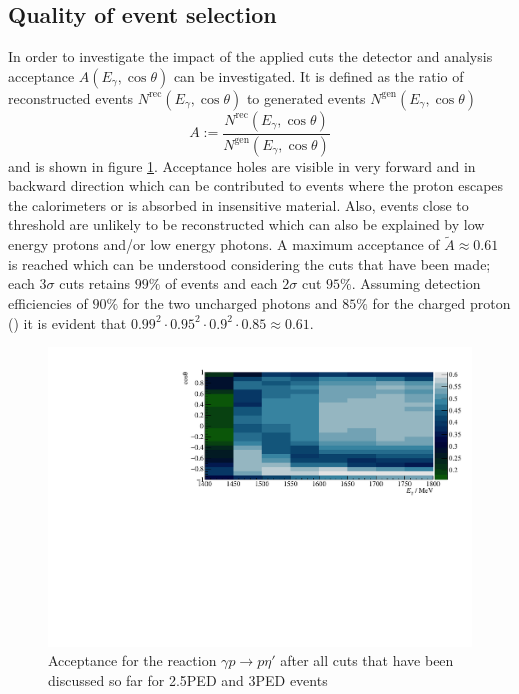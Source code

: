 \subsection{Quality of event selection}
In order to investigate the impact of the applied cuts the detector and analysis acceptance $A(E_\gamma,\cos\theta)$ can be investigated. It is defined as the ratio of reconstructed events $N^\text{rec}(E_\gamma,\cos\theta)$ to generated events $N^\text{gen}(E_\gamma,\cos\theta)$ \begin{equation}
	A:=\frac{N^\text{rec}(E_\gamma,\cos\theta)}{N^\text{gen}(E_\gamma,\cos\theta)}
\end{equation}
and is shown in figure \ref{fig:acc}. Acceptance holes are visible in very forward and in backward direction which can be contributed to events where the proton escapes the calorimeters or is absorbed in insensitive material. Also, events close to threshold are unlikely to be reconstructed which can also be explained by low energy protons and/or low energy photons. A maximum acceptance of $\tilde{A}\approx0.61$ is reached which can be understood considering the cuts that have been made; each $3\sigma$ cuts retains $99\%$ of events and each $2\sigma$ cut $95\%$. Assuming detection efficiencies of $90\%$ for the two uncharged photons and $85\%$ for the charged proton (\cite{farahphd,hartmannphd}) it is evident that $0.99^2\cdot0.95^2\cdot0.9^2\cdot0.85\approx0.61$.
\begin{figure}[htbp]
	\centering
	\includegraphics[width=\linewidth]{../figs/hydrogen/acceptance.pdf}
	\caption{Acceptance for the reaction $\gamma p\to p \eta'$ after all cuts that have been discussed so far for 2.5PED and 3PED events}
	\label{fig:acc}
\end{figure}
